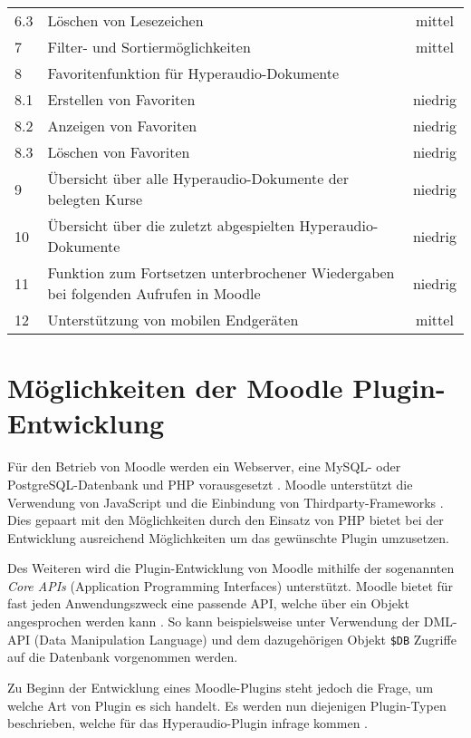 \begin{table}[!ht]
\begin{tabularx}{\textwidth}{lXc}
   	6.3 & \hspace*{0.5cm} Löschen von Lesezeichen & mittel\\
   	7 & Filter- und Sortiermöglichkeiten & mittel\\
    8 & Favoritenfunktion für Hyperaudio-Dokumente & \\
    8.1 & \hspace*{0.5cm} Erstellen von Favoriten & niedrig\\
    8.2 & \hspace*{0.5cm} Anzeigen von Favoriten & niedrig\\
    8.3 & \hspace*{0.5cm} Löschen von Favoriten & niedrig\\    
    9 & Übersicht über alle Hyperaudio-Dokumente der belegten Kurse & niedrig\\
    10 & Übersicht über die zuletzt abgespielten Hyperaudio-Dokumente & niedrig\\
    11 &  Funktion zum Fortsetzen unterbrochener Wiedergaben bei folgenden Aufrufen in Moodle & niedrig\\
    12 & Unterstützung von mobilen Endgeräten & mittel\\
    \hline
\end{tabularx}
\end{table}

\section{Möglichkeiten der Moodle Plugin-Entwicklung}
Für den Betrieb von Moodle werden ein Webserver, eine MySQL- oder PostgreSQL-Datenbank und PHP vorausgesetzt . Moodle unterstützt die Verwendung von JavaScript und die Einbindung von Thirdparty-Frameworks \citep{wild2017moodle}. Dies gepaart mit den Möglichkeiten durch den Einsatz von PHP bietet bei der Entwicklung ausreichend Möglichkeiten um das gewünschte Plugin umzusetzen.

Des Weiteren wird die Plugin-Entwicklung von Moodle mithilfe der sogenannten \textit{Core APIs} (Application Programming Interfaces) unterstützt. Moodle bietet für fast jeden Anwendungszweck eine passende API, welche über ein Objekt angesprochen werden kann \citep{wild2017moodle}. So kann beispielsweise unter Verwendung der DML-API (Data Manipulation Language) und dem dazugehörigen Objekt \texttt{\$DB} Zugriffe auf die Datenbank vorgenommen werden.

Zu Beginn der Entwicklung eines Moodle-Plugins steht jedoch die Frage, um welche Art von Plugin es sich handelt. Es werden nun diejenigen Plugin-Typen beschrieben, welche für das Hyperaudio-Plugin infrage kommen \citep{moodle2017plugin}.


